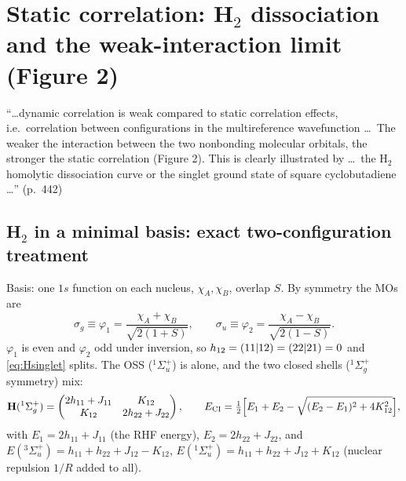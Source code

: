 \section{Static correlation: H$_2$ dissociation and the weak-interaction limit (Figure 2)}\label{sec:static}

\begin{reviewclaim}
``\dots dynamic correlation is weak compared to static correlation effects, i.e.\ correlation between
configurations in the multireference wavefunction \dots\ The weaker the interaction between the two
nonbonding molecular orbitals, the stronger the static correlation (Figure 2). This is clearly
illustrated by \dots\ the H$_2$ homolytic dissociation curve or the singlet ground state of square
cyclobutadiene \dots'' (p.~442)
\end{reviewclaim}

\subsection{H$_2$ in a minimal basis: exact two-configuration treatment}
Basis: one $1s$ function on each nucleus, $\chi_A,\chi_B$, overlap $S$. By symmetry the MOs are
\begin{equation}
  \sigma_g\equiv\varphi_1=\frac{\chi_A+\chi_B}{\sqrt{2(1+S)}},\qquad
  \sigma_u\equiv\varphi_2=\frac{\chi_A-\chi_B}{\sqrt{2(1-S)}} .
\end{equation}
$\varphi_1$ is even and $\varphi_2$ odd under inversion, so $h_{12}=(11\vert 12)=(22\vert 21)=0$ and \cref{eq:Hsinglet}
splits. The OSS ($^1\Sigma_u^+$) is alone, and the two closed shells ($^1\Sigma_g^+$ symmetry) mix:
\begin{equation}\label{eq:h2ci}
  \mathbf H(^1\Sigma_g^+)=\begin{pmatrix}2h_{11}+J_{11}&K_{12}\\K_{12}&2h_{22}+J_{22}\end{pmatrix},\qquad
  E_{\text{CI}}=\tfrac12\Bigl[E_1+E_2-\sqrt{(E_2-E_1)^2+4K_{12}^2}\Bigr],
\end{equation}
with $E_1=2h_{11}+J_{11}$ (the RHF energy), $E_2=2h_{22}+J_{22}$, and
$E(^3\Sigma_u^+)=h_{11}+h_{22}+J_{12}-K_{12}$, $E(^1\Sigma_u^+)=h_{11}+h_{22}+J_{12}+K_{12}$
(nuclear repulsion $1/R$ added to all).


